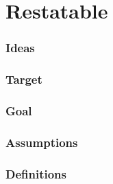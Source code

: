 \chapter{Restatable}
\label{cha:restatable}

\subsection*{Ideas}

\ideaDefeatersForCS*

\ideaEIS*

\ideaUSE*

\ideaCSbyAR*

\ideaCSbyWR*

\subsection*{Target}

\targetESU*

\targeGESU*

\subsection*{Goal}

\goalEAS*

\thoughtEASw*

\subsection*{Assumptions}

\assuCSVP*

\assuCSRR*

\assuNFCS*

\assuEIS*

\assuCSbyPCS*

\assuCSPersists*

\assuDetachToClaim*

\subsection*{Definitions}









